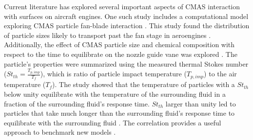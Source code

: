 \documentclass[%
 aip,
 amsmath,amssymb,
 reprint,%
]{revtex4-1}
\begin{document}
Current literature has explored several important aspects of CMAS interaction with surfaces on aircraft engines. One such study includes a computational model exploring CMAS particle fan-blade interaction \cite{Vogel2018}. This study found the distribution of particle sizes likely to transport past the fan stage in aeroengines \cite{Vogel2018}. Additionally, the effect of CMAS particle size and chemical composition with respect to the time to equilibrate on the nozzle guide vane was explored \cite{Bojdo2019}. The particle’s properties were summarized using the measured thermal Stokes number ($St_{th}=\frac{T_{p,imp}}{T_f}$), which is ratio of particle impact temperature ($T_{p,imp}$) to the air temperature ($T_f$). The study showed that the temperature of particles with a $St_{th}$ below unity equilibrate with the temperature of the surrounding fluid in a fraction of the surrounding fluid’s response time. $St_{th}$ larger than unity led to particles that take much longer than the surrounding fluid’s response time to equilibrate with the surrounding fluid \cite{Bojdo2019}. The correlation provides a useful approach to benchmark new models \cite{Cavainolo2022}.
\end{document}
